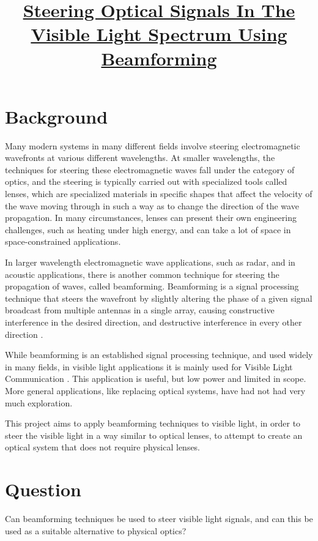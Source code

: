 \documentclass[12pt]{article}
\date{}
\title{
  \fontsize{14}{16}\selectfont \underline{
    \textbf{Steering Optical Signals In The Visible Light Spectrum Using Beamforming}
    }
}
\begin{document}
\maketitle
\vspace{-7em}

\section{Background}
\vspace{-1em}
\par
Many modern systems in many different fields involve steering
electromagnetic wavefronts at various different wavelengths. At smaller
wavelengths, the techniques for steering these electromagnetic waves
fall under the category of optics, and the steering is typically carried
out with specialized tools called lenses, which are specialized
materials in specific shapes that affect the velocity of the wave moving
through in such a way as to change the direction of the wave
propagation. In many circumstances, lenses can present their own
engineering challenges, such as heating under high energy, and can take
a lot of space in space-constrained applications.
\par
In larger wavelength electromagnetic wave applications, such as radar, and
in acoustic applications, there is another common technique for steering
the propagation of waves, called beamforming. Beamforming is a signal
processing technique that steers the wavefront by slightly altering the
phase of a given signal broadcast from multiple antennas in a single
array, causing constructive interference in the desired direction, and
destructive interference in every other direction \cite{Lichtman_PySDR_2023}.
\par
While beamforming is an established signal processing technique, and used
widely in many fields, in visible light applications it is mainly used for Visible
Light Communication \cite{GUPTA2024111182}. This application is useful, but low power
and limited in scope. More general applications, like replacing optical systems, have
had not had very much exploration.
\par
This project aims to apply beamforming techniques to
visible light, in order to steer the visible light in a way similar to
optical lenses, to attempt to create an optical system that does not
require physical lenses.

\section{Question}
Can beamforming techniques be used to steer visible light signals,
and can this be used as a suitable alternative to physical optics?
\end{document}
